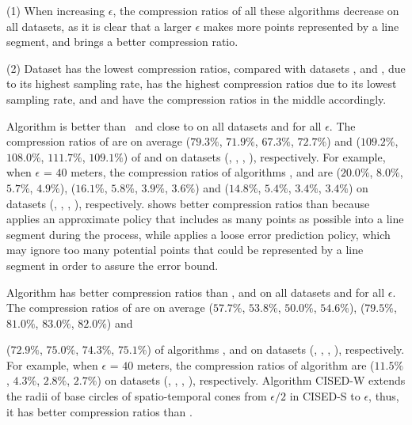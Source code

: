 {\ni (1) When increasing $\epsilon$, the compression ratios of all these algorithms decrease on all datasets,
{as it is clear that a larger $\epsilon$ makes more points represented by a line segment, and brings a better compression ratio.}

\ni (2) Dataset \pricar has the lowest compression ratios, compared with datasets \mopsi, \sercar and \geolife, due to its highest sampling rate,
\sercar has the highest compression ratios due to its lowest sampling rate, and \geolife and \mopsi have the compression ratios in the middle accordingly.

 Algorithm \cist is better than \squishe ~{and close to} \dps on all datasets and for all $\epsilon$.
%
The compression ratios of \cist are on average {($79.3\%$, $71.9\%$, $67.3\%$, $72.7\%$) and ($109.2\%$, $108.0\%$, $111.7\%$, $109.1\%$)} of \squishe and
\dps on {datasets (\sercar, \geolife, \mopsi, \pricar)}, respectively.
For example, when $\epsilon$ = $40$ meters, the compression ratios of algorithms
\squishe, \cist and \dps are
{($20.0\%$, $8.0\%$, $5.7\%$, $4.9\%$), ($16.1\%$, $5.8\%$, $3.9\%$, $3.6\%$) and ($14.8\%$, $5.4\%$, $3.4\%$, $3.4\%$)} on  {datasets (\sercar, \geolife, \mopsi, \pricar)}, respectively.
{\cist shows better compression ratios than \squishe because \cist applies an approximate policy that includes as many points as possible into a line segment during the process, while \squishe applies a loose error prediction policy, which may ignore too many potential points that could be represented by a line segment  in order to assure the error bound.}


 Algorithm \cista has better compression ratios than \dps, \squishe and \cist on all datasets and for all $\epsilon$.
The compression ratios of \cista are on average ($57.7\%$, $53.8\%$, $50.0\%$, $54.6\%$), ($79.5\%$, $81.0\%$, $83.0\%$, $82.0\%$) and {($72.9\%$, $75.0\%$, $74.3\%$, $75.1\%$) of algorithms
\squishe, \dps and \cist on {datasets (\sercar, \geolife, \mopsi, \pricar)}, respectively.
For example, when $\epsilon$ = $40$ meters, the compression ratios of algorithm
\cista are ($11.5\%$, $4.3\%$, $2.8\%$, $2.7\%$) on datasets (\sercar, \geolife, \mopsi, \pricar), respectively.
%
{Algorithm CISED-W extends the radii of base circles of spatio-temporal cones from $\epsilon/2$ in CISED-S to $\epsilon$, thus, it has better compression ratios than \cist.}

}}
